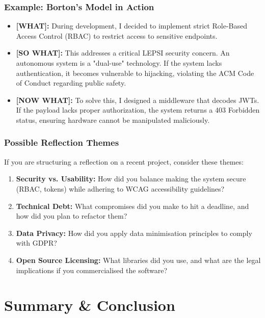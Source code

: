 \documentclass[xcolor=table]{beamer}
\begin{document}
\begin{frame}
    \frametitle{Example: Borton's Model in Action}
    \small
    \begin{itemize}
        \item \textbf{[WHAT]:} During development, I decided to implement strict Role-Based Access Control (RBAC) to restrict access to sensitive endpoints.
        \item \textbf{[SO WHAT]:} This addresses a critical LEPSI security concern. An autonomous system is a "dual-use" technology. If the system lacks authentication, it becomes vulnerable to hijacking, violating the ACM Code of Conduct regarding public safety.
        \item \textbf{[NOW WHAT]:} To solve this, I designed a middleware that decodes JWTs. If the payload lacks proper authorization, the system returns a 403 Forbidden status, ensuring hardware cannot be manipulated maliciously.
    \end{itemize}
\end{frame}

\begin{frame}
    \frametitle{Possible Reflection Themes}
    If you are structuring a reflection on a recent project, consider these themes:
    
    \begin{enumerate}
        \item \textbf{Security vs. Usability:} How did you balance making the system secure (RBAC, tokens) while adhering to WCAG accessibility guidelines?
        \item \textbf{Technical Debt:} What compromises did you make to hit a deadline, and how did you plan to refactor them?
        \item \textbf{Data Privacy:} How did you apply data minimisation principles to comply with GDPR?
        \item \textbf{Open Source Licensing:} What libraries did you use, and what are the legal implications if you commercialised the software?
    \end{enumerate}
\end{frame}

\section{Summary \& Conclusion}
\end{document}
